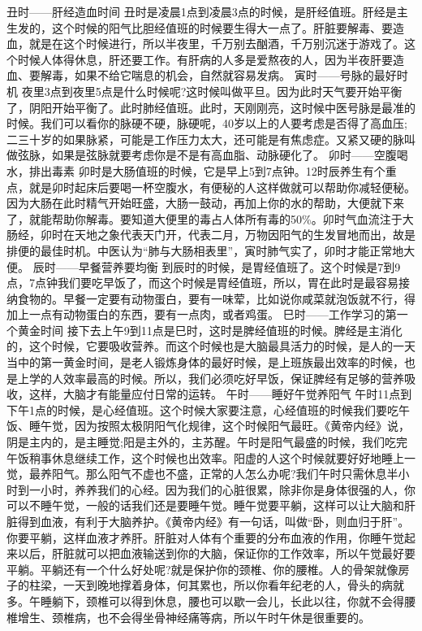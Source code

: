 丑时——肝经造血时间
丑时是凌晨1点到凌晨3点的时候，是肝经值班。肝经是主生发的，这个时候的阳气比胆经值班的时候要生得大一点了。肝脏要解毒、要造血，就是在这个时候进行，所以半夜里，千万别去酗酒，千万别沉迷于游戏了。这个时候人体得休息，肝还要工作。有肝病的人多是爱熬夜的人，因为半夜肝要造血、要解毒，如果不给它喘息的机会，自然就容易发病。
寅时——号脉的最好时机
夜里3点到夜里5点是什么时候呢?这时候叫做平旦。因为此时天气要开始平衡了，阴阳开始平衡了。此时肺经值班。此时，天刚刚亮，这时候中医号脉是最准的时候。我们可以看你的脉硬不硬，脉硬呢，40岁以上的人要考虑是否得了高血压;二三十岁的如果脉紧，可能是工作压力太大，还可能是有焦虑症。又紧又硬的脉叫做弦脉，如果是弦脉就要考虑你是不是有高血脂、动脉硬化了。
卯时——空腹喝水，排出毒素
卯时是大肠值班的时候，它是早上5到7点钟。12时辰养生有个重点，就是卯时起床后要喝一杯空腹水，有便秘的人这样做就可以帮助你减轻便秘。因为大肠在此时精气开始旺盛，大肠一鼓动，再加上你的水的帮助，大便就下来了，就能帮助你解毒。要知道大便里的毒占人体所有毒的50\%。卯时气血流注于大肠经，卯时在天地之象代表天门开，代表二月，万物因阳气的生发冒地而出，故是排便的最佳时机。中医认为“肺与大肠相表里”，寅时肺气实了，卯时才能正常地大便。
辰时——早餐营养要均衡
到辰时的时候，是胃经值班了。这个时候是7到9点，7点钟我们要吃早饭了，而这个时候是胃经值班，所以，胃在此时是最容易接纳食物的。早餐一定要有动物蛋白，要有一味荤，比如说你咸菜就泡饭就不行，得加上一点有动物蛋白的东西，要有一点肉，或者鸡蛋。
巳时——工作学习的第一个黄金时间
接下去上午9到11点是巳时，这时是脾经值班的时候。脾经是主消化的，这个时候，它要吸收营养。而这个时候也是大脑最具活力的时候，是人的一天当中的第一黄金时间，是老人锻炼身体的最好时候，是上班族最出效率的时候，也是上学的人效率最高的时候。所以，我们必须吃好早饭，保证脾经有足够的营养吸收，这样，大脑才有能量应付日常的运转。
午时——睡好午觉养阳气
午时11点到下午1点的时候，是心经值班。这个时候大家要注意，心经值班的时候我们要吃午饭、睡午觉，因为按照太极阴阳气化规律，这个时候阳气最旺。《黄帝内经》说，阴是主内的，是主睡觉;阳是主外的，主苏醒。午时是阳气最盛的时候，我们吃完午饭稍事休息继续工作，这个时候也出效率。阳虚的人这个时候就要好好地睡上一觉，最养阳气。那么阳气不虚也不盛，正常的人怎么办呢?我们午时只需休息半小时到一小时，养养我们的心经。因为我们的心脏很累，除非你是身体很强的人，你可以不睡午觉，一般的话我们还是要睡午觉。睡午觉要平躺，这样可以让大脑和肝脏得到血液，有利于大脑养护。《黄帝内经》有一句话，叫做“卧，则血归于肝”。你要平躺，这样血液才养肝。肝脏对人体有个重要的分布血液的作用，你睡午觉起来以后，肝脏就可以把血液输送到你的大脑，保证你的工作效率，所以午觉最好要平躺。平躺还有一个什么好处呢?就是保护你的颈椎、你的腰椎。人的骨架就像房子的柱梁，一天到晚地撑着身体，何其累也，所以你看年纪老的人，骨头的病就多。午睡躺下，颈椎可以得到休息，腰也可以歇一会儿，长此以往，你就不会得腰椎增生、颈椎病，也不会得坐骨神经痛等病，所以午时午休是很重要的。
